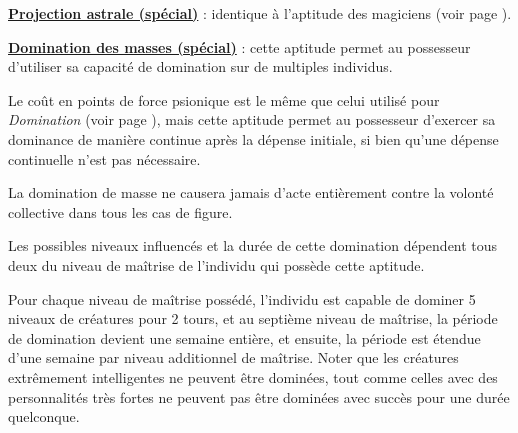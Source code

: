 \bigskip

\textbf{\uline{Projection astrale (spécial)}} : identique à l'aptitude des magiciens (voir page \pageref{magicien-projection-astrale}).

\bigskip

\textbf{\uline{Domination des masses (spécial)}} : cette aptitude permet au possesseur d'utiliser sa capacité de domination sur de multiples individus.

\bigskip

Le coût en points de force psionique est le même que celui utilisé pour \textit{Domination} (voir page \pageref{guerrier-domination}), mais cette aptitude permet au possesseur d'exercer sa dominance de manière continue après la dépense initiale, si bien qu'une dépense continuelle n'est pas nécessaire.

\bigskip

La domination de masse ne causera jamais d'acte entièrement contre la volonté collective dans tous les cas de figure.

\bigskip

Les possibles niveaux influencés et la durée de cette domination dépendent tous deux du niveau de maîtrise de l'individu qui possède cette aptitude.

\bigskip

Pour chaque niveau de maîtrise possédé, l'individu est capable de dominer 5 niveaux de créatures pour 2 tours, et au septième niveau de maîtrise, la période de domination devient une semaine entière, et ensuite, la période est étendue d'une semaine par niveau additionnel de maîtrise. Noter que les créatures extrêmement intelligentes ne peuvent être dominées, tout comme celles avec des personnalités très fortes ne peuvent pas être dominées avec succès pour une durée quelconque.

\bigskip

